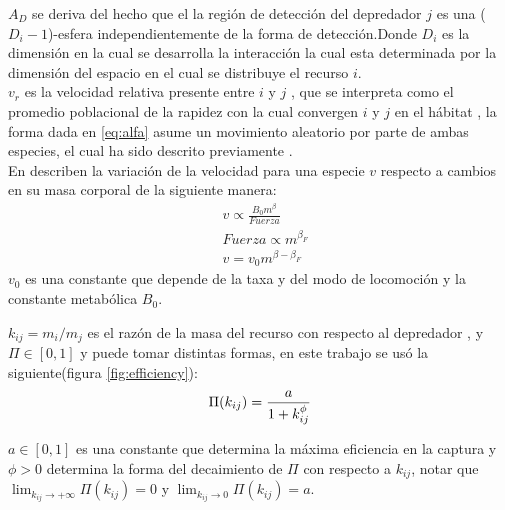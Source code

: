 $A_D$ se deriva del hecho que el la regi\'on de detecci\'on del depredador $j$ es una ($D_i-1$)-esfera independientemente de la forma de detecci\'on\citep{pawar2012dimensionality}.Donde $D_i$ es la dimensi\'on en la cual se desarrolla la interacci\'on la cual esta determinada por la dimensi\'on del espacio en el cual se distribuye el recurso $i$.\\
$v_r$ es la velocidad relativa presente entre $i$ y $j$ , que se interpreta como el promedio poblacional de la rapidez con la cual convergen $i$ y $j$ en el h\'abitat \citep[supinfo.]{pawar2012dimensionality} , la forma dada en \eqref{eq:alfa} asume un movimiento aleatorio por parte de ambas especies, el cual ha sido descrito previamente \citep{okubo2001diffusion}.\\
En \cite{pawar2012dimensionality} describen la variaci\'on de la velocidad para una especie $v$ respecto a cambios en su masa corporal de la siguiente manera:
\begin{equation}\label{eq:vel}
\begin{aligned}
&v \propto \frac{B_0 m^\beta}{Fuerza}\\
&Fuerza \propto m^{\beta_F} \\
&v = v_0m^{\beta - \beta_F}
\end{aligned}
\end{equation}
$v_0$ es una constante que depende de la taxa y del modo de locomoci\'on y la constante metab\'olica $B_0$.\\ 

$k_{ij}= m_i/m_j$ es el raz\'on de la masa del recurso con respecto al depredador , y $\Pi \in [0,1]$ y  puede tomar distintas formas\citep{weitz2006size}, en este trabajo se us\'o la siguiente(figura \ref{fig:efficiency}): 
\begin{equation}\label{eq:sr}
\Pi(k_{ij}) =\frac{a}{1+k_{ij}^\phi} \\
\end{equation}

$a \in [0,1] $ es una constante que determina la m\'axima eficiencia en la captura y $\phi > 0 $ determina la forma del decaimiento de $\Pi$ con respecto a $k_{ij}$, notar que $\lim_{k_{ij} \to +\infty}  \Pi(k_{ij}) = 0$ y  $\lim_{k_{ij} \to 0} \Pi(k_{ij}) = a $.

